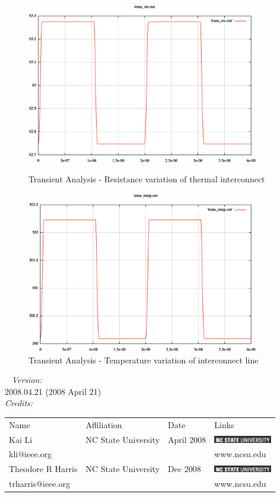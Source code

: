 \documentclass{article}
\begin{document}
\begin{figure}[h]
\centerline{\includegraphics[width=4in]{trans_res.eps}}\caption{Transient Analysis - Resistance variation of thermal interconnect}
\centerline{\includegraphics[width=4in]{trans_temp.eps}}\caption{Transient Analysis - Temperature variation of interconnect line}
\end{figure}
\clearpage
~
\myThickLine
\textit{Version:}\\
2008.04.21 (2008 April 21) \\
\myThickLine
\medskip
\textit{Credits:}\\
\begin{tabular}{l  l  l  l}
Name & Affiliation & Date & Links \\
Kai Li & NC State University & April 2008 & \includegraphics[width=1in]{logo.eps}  \\
kli@ieee.org & & & www.ncsu.edu    \\
Theodore R Harris & NC State University & Dec 2008 & \includegraphics[width=1in]{logo.eps}  \\
trharris@ieee.org & & & www.ncsu.edu    \\
\end{tabular}
\end{document}
